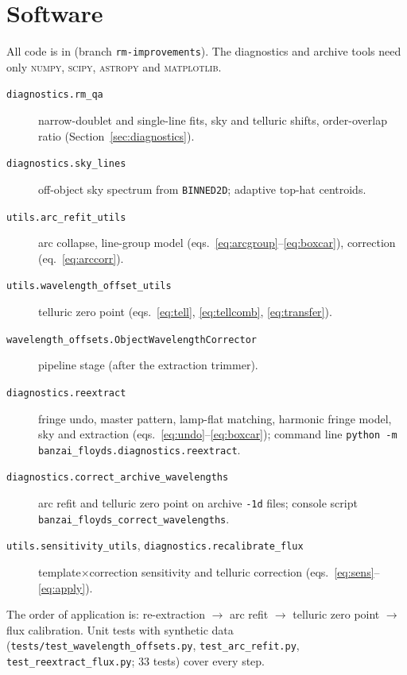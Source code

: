 \section{Software}
\label{sec:software}

All code is in \banzai{} (branch \texttt{rm-improvements}). The diagnostics and archive tools need only
\textsc{numpy}, \textsc{scipy}, \textsc{astropy} and \textsc{matplotlib}.

\begin{description}
\item[\texttt{diagnostics.rm\_qa}] narrow-doublet and single-line fits, sky and telluric shifts, order-overlap ratio
(Section~\ref{sec:diagnostics}).
\item[\texttt{diagnostics.sky\_lines}] off-object sky spectrum from \texttt{BINNED2D}; adaptive top-hat centroids.
\item[\texttt{utils.arc\_refit\_utils}] arc collapse, line-group model (eqs.~\ref{eq:arcgroup}--\ref{eq:boxcar}),
correction (eq.~\ref{eq:arccorr}).
\item[\texttt{utils.wavelength\_offset\_utils}] telluric zero point (eqs.~\ref{eq:tell}, \ref{eq:tellcomb},
\ref{eq:transfer}).
\item[\texttt{wavelength\_offsets.ObjectWavelengthCorrector}] pipeline stage (after the extraction trimmer).
\item[\texttt{diagnostics.reextract}] fringe undo, master pattern, lamp-flat matching, harmonic fringe model, sky and extraction
(eqs.~\ref{eq:undo}--\ref{eq:boxcar}); command line \texttt{python -m banzai\_floyds.diagnostics.reextract}.
\item[\texttt{diagnostics.correct\_archive\_wavelengths}] arc refit and telluric zero point on archive
\texttt{-1d} files; console script \texttt{banzai\_floyds\_correct\_wavelengths}.
\item[\texttt{utils.sensitivity\_utils}, \texttt{diagnostics.recalibrate\_flux}] template$\times$correction
sensitivity and telluric correction (eqs.~\ref{eq:sens}--\ref{eq:apply}).
\end{description}
The order of application is: re-extraction $\rightarrow$ arc refit $\rightarrow$ telluric zero point
$\rightarrow$ flux calibration. Unit tests with synthetic data (\texttt{tests/test\_wavelength\_offsets.py},
\texttt{test\_arc\_refit.py}, \texttt{test\_reextract\_flux.py}; 33 tests) cover every step.
